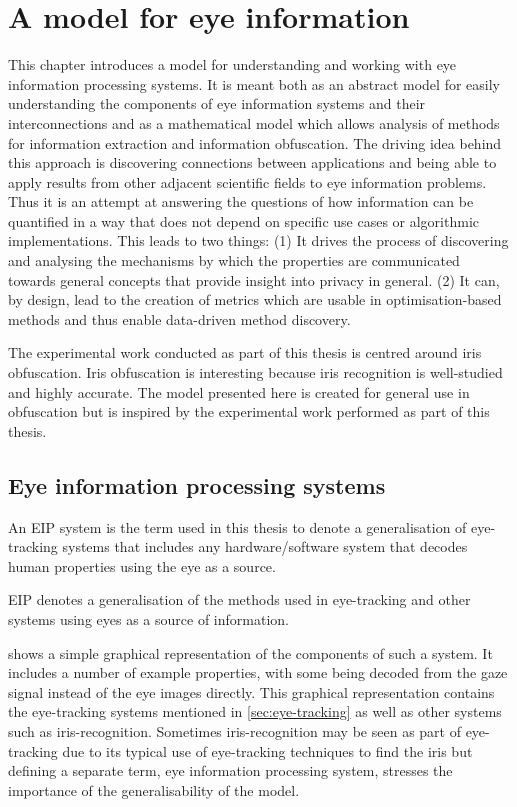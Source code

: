 \chapter{A model for eye information}
This chapter introduces a model for understanding and working with eye information processing systems. It is meant both as an abstract model for easily understanding the components of eye information systems and their interconnections and as a mathematical model which allows analysis of methods for information extraction and information obfuscation. The driving idea behind this approach is discovering connections between applications and being able to apply results from other adjacent scientific fields to eye information problems. Thus it is an attempt at answering the questions of how information can be quantified in a way that does not depend on specific use cases or algorithmic implementations. This leads to two things: (1) It drives the process of discovering and analysing the mechanisms by which the properties are communicated towards general concepts that provide insight into privacy in general. (2) It can, by design, lead to the creation of metrics which are usable in optimisation-based methods and thus enable data-driven method discovery.

The experimental work conducted as part of this thesis is centred around iris obfuscation. Iris obfuscation is interesting because iris recognition is well-studied and highly accurate. The model presented here is created for general use in obfuscation but is inspired by the experimental work performed as part of this thesis.

\section{Eye information processing systems}
An EIP system is the term used in this thesis to denote a generalisation of eye-tracking systems that includes any hardware/software system that decodes human properties using the eye as a source. 

\begin{definition}
	EIP denotes a generalisation of the methods used in eye-tracking and other systems using eyes as a source of information. 
\end{definition}

 shows a simple graphical representation of the components of such a system. It includes a number of example properties, with some being decoded from the gaze signal instead of the eye images directly. This graphical representation contains the eye-tracking systems mentioned in \cref{sec:eye-tracking} as well as other systems such as iris-recognition. Sometimes iris-recognition may be seen as part of eye-tracking due to its typical use of eye-tracking techniques to find the iris but defining a separate term, eye information processing system, stresses the importance of the generalisability of the model.

